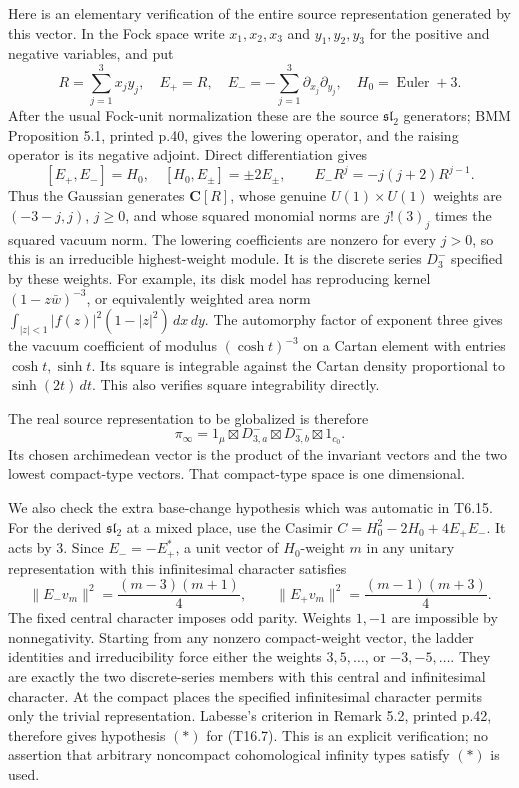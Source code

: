 Here is an elementary verification of the entire source representation generated by this vector. In the Fock space write \(x_1,x_2,x_3\) and \(y_1,y_2,y_3\) for the positive and negative variables, and put \[
R=\sum_{j=1}^3x_jy_j,
\quad E_+=R,
\quad E_-=-\sum_{j=1}^3\partial_{x_j}\partial_{y_j},
\quad H_0=\operatorname{Euler}+3.
\tag{T16.5}
\] After the usual Fock-unit normalization these are the source \(\mathfrak{sl}_2\) generators; BMM Proposition 5.1, printed p.40, gives the lowering operator, and the raising operator is its negative adjoint. Direct differentiation gives \[
[E_+,E_-]=H_0,\quad [H_0,E_\pm]=\pm2E_\pm,
\qquad E_-R^j=-j(j+2)R^{j-1}.
\tag{T16.6}
\] Thus the Gaussian generates \(\mathbf C[R]\), whose genuine \(U(1)\times U(1)\) weights are \((-3-j,j)\), \(j\ge0\), and whose squared monomial norms are \(j!(3)_j\) times the squared vacuum norm. The lowering coefficients are nonzero for every \(j>0\), so this is an irreducible highest-weight module. It is the discrete series \(D_3^-\) specified by these weights. For example, its disk model has reproducing kernel \((1-z\bar w)^{-3}\), or equivalently weighted area norm \(\int_{|z|<1}|f(z)|^2(1-|z|^2)\,dx\,dy\). The automorphy factor of exponent three gives the vacuum coefficient of modulus \((\cosh t)^{-3}\) on a Cartan element with entries \(\cosh t,\sinh t\). Its square is integrable against the Cartan density proportional to \(\sinh(2t)\,dt\). This also verifies square integrability directly.

The real source representation to be globalized is therefore \[
\pi_\infty=1_{\mu}\boxtimes D_{3,a}^-\boxtimes D_{3,b}^-\boxtimes1_{c_0}.
\tag{T16.7}
\] Its chosen archimedean vector is the product of the invariant vectors and the two lowest compact-type vectors. That compact-type space is one dimensional.

We also check the extra base-change hypothesis which was automatic in T6.15. For the derived \(\mathfrak{sl}_2\) at a mixed place, use the Casimir \(C=H_0^2-2H_0+4E_+E_-\). It acts by \(3\). Since \(E_-=-E_+^*\), a unit vector of \(H_0\)-weight \(m\) in any unitary representation with this infinitesimal character satisfies \[
\|E_-v_m\|^2=\frac{(m-3)(m+1)}4,
\qquad
\|E_+v_m\|^2=\frac{(m-1)(m+3)}4.
\tag{T16.8}
\] The fixed central character imposes odd parity. Weights \(1,-1\) are impossible by nonnegativity. Starting from any nonzero compact-weight vector, the ladder identities and irreducibility force either the weights \(3,5,\ldots\), or \(-3,-5,\ldots\). They are exactly the two discrete-series members with this central and infinitesimal character. At the compact places the specified infinitesimal character permits only the trivial representation. Labesse's criterion in Remark 5.2, printed p.42, therefore gives hypothesis \((*)\) for (T16.7). This is an explicit verification; no assertion that arbitrary noncompact cohomological infinity types satisfy \((*)\) is used.

